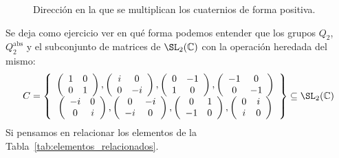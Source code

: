 \begin{ejemplo}
\begin{figure}[H]
 \hspace{1cm}
        \caption{Dirección en la que se multiplican los cuaternios de forma positiva.}
        \label{fig:cuaternios}
    \end{figure}
    Se deja como ejercicio ver en qué forma podemos entender que los grupos $Q_2$, $Q_2^{\text{abs}}$ y el subconjunto de matrices de $\SL_2(\mathbb{C})$ con la operación heredada del mismo:
    \begin{equation*}
        C = \left\{\begin{array}{c}
            \left(\begin{array}{cc}
                1 & 0 \\
                0 & 1 
            \end{array}\right), \left(\begin{array}{cc}
                i & 0 \\
                0 & -i 
            \end{array}\right),\left(\begin{array}{cc}
                0 & -1 \\
                1 & 0 
            \end{array}\right),\left(\begin{array}{cc}
                -1 & 0 \\
                0 & -1 
            \end{array}\right) \\
            \left(\begin{array}{cc}
                -i & 0 \\
                0 & i 
            \end{array}\right) , \left(\begin{array}{cc}
                0 & -i \\
                -i & 0 
            \end{array}\right), \left(\begin{array}{cc}
                0 & 1 \\
                -1 & 0 
            \end{array}\right), \left(\begin{array}{cc}
                0 & i \\
                i & 0 
            \end{array}\right)
        \end{array}\right\} \subseteq \SL_2(\mathbb{C})
    \end{equation*}
    Si pensamos en relacionar los elementos de la Tabla~\ref{tab:elementos_relacionados}.


\end{ejemplo}
